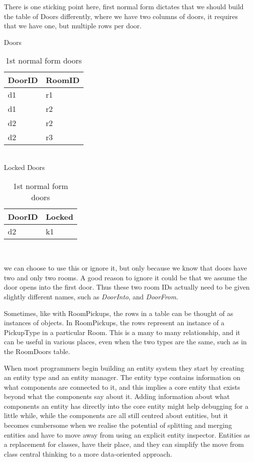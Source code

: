 There is one sticking point here, first normal form dictates that we should
build the table of Doors differently, where we have two columns of doors, it
requires that we have one, but multiple rows per door. 

\begin{table}[h]\footnotesize
Doors \\
\begin{tabular}{ll}
\bf{DoorID}&RoomID \\
\hline
d1&r1 \\
d1&r2 \\
d2&r2 \\
d2&r3 \\
\end{tabular}\\
Locked Doors \\
\begin{tabular}{ll}
\bf{DoorID}&Locked \\
\hline
d2&k1 \\
\end{tabular}\\
\caption{1st normal form doors}
\end{table}

we can choose to use this or ignore it, but only because we know that doors
have two and only two rooms. A good reason to ignore it could be that we assume
the door opens into the first door. Thus these two room IDs actually need to be
given slightly different names, such as \emph{DoorInto}, and \emph{DoorFrom}.

Sometimes, like with RoomPickups, the rows in a table can be thought of as
instances of objects. In RoomPickups, the rows represent an instance of a
PickupType in a particular Room. This is a many to many relationship, and it
can be useful in various places, even when the two types are the same, such as
in the RoomDoors table.

When most programmers begin building an entity system they start by creating an
entity type and an entity manager. The entity type contains information on what
components are connected to it, and this implies a core entity that exists
beyond what the components say about it. Adding information about what
components an entity has directly into the core entity might help debugging for
a little while, while the components are all still centred about entities, but
it becomes cumbersome when we realise the potential of splitting and merging
entities and have to move away from using an explicit entity inspector.
Entities as a replacement for classes, have their place, and they can simplify
the move from class central thinking to a more data-oriented approach.

